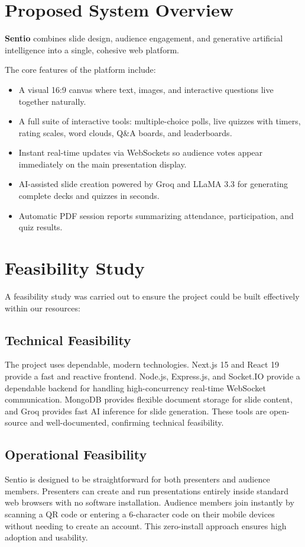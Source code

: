 \section{Proposed System Overview}

\textbf{Sentio} combines slide design, audience engagement, and generative artificial intelligence into a single, cohesive web platform. 

The core features of the platform include:
\begin{itemize}
    \item A visual 16:9 canvas where text, images, and interactive questions live together naturally.
    \item A full suite of interactive tools: multiple-choice polls, live quizzes with timers, rating scales, word clouds, Q\&A boards, and leaderboards.
    \item Instant real-time updates via WebSockets so audience votes appear immediately on the main presentation display.
    \item AI-assisted slide creation powered by Groq and LLaMA 3.3 for generating complete decks and quizzes in seconds.
    \item Automatic PDF session reports summarizing attendance, participation, and quiz results.
\end{itemize}

\section{Feasibility Study}

A feasibility study was carried out to ensure the project could be built effectively within our resources:

\subsection{Technical Feasibility}
The project uses dependable, modern technologies. Next.js 15 and React 19 provide a fast and reactive frontend. Node.js, Express.js, and Socket.IO provide a dependable backend for handling high-concurrency real-time WebSocket communication. MongoDB provides flexible document storage for slide content, and Groq provides fast AI inference for slide generation. These tools are open-source and well-documented, confirming technical feasibility.

\subsection{Operational Feasibility}
Sentio is designed to be straightforward for both presenters and audience members. Presenters can create and run presentations entirely inside standard web browsers with no software installation. Audience members join instantly by scanning a QR code or entering a 6-character code on their mobile devices without needing to create an account. This zero-install approach ensures high adoption and usability.

